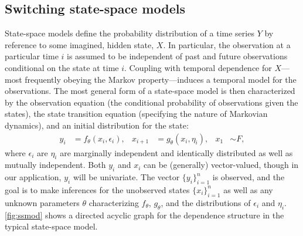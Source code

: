 \documentclass[12pt]{article}
\begin{document}
\subsection{Switching state-space models}

State-space models define the probability distribution of a time 
series $Y$ by reference to some imagined, hidden state, $X$. In
particular, the observation at a particular time $i$ is assumed to be
independent of past and future observations conditional on the state
at time $i$. Coupling with temporal dependence for $X$---most
frequently obeying the Markov property---induces a temporal model for
the observations.  The most general form of a state-space model is
then characterized by the 
observation equation (the conditional probability of observations
given the states),
the state transition equation (specifying the nature of Markovian
dynamics), and an initial distribution for the state: 
\begin{equation}
\begin{aligned}
  y_i &= f_\theta(x_i,\epsilon_i), &
  x_{i+1} &= g_\theta(x_i,\eta_i), &
  x_1 &\sim F,
\end{aligned}
\label{eq:ssmod}
\end{equation}
where $\epsilon_i$ are $\eta_i$ are marginally independent and
identically distributed  as well as mutually independent. Both
$y_i$ and $x_i$ can be (generally) vector-valued, though in our
application, $y_i$ will be univariate. The
vector $\{y_i\}_{i=1}^n$ is observed, and the goal is to make
inferences for the unobserved states $\{x_i\}_{i=1}^n$ as well as any
unknown parameters $\theta$ characterizing $f_\theta$, $g_\theta$, and
the distributions of $\epsilon_i$ and $\eta_i$.  \autoref{fig:ssmod}
shows a directed acyclic graph for the dependence structure in the
typical state-space model.
\end{document}
